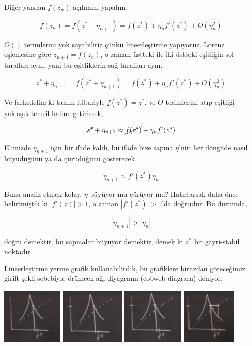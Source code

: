 \documentclass[12pt,fleqn]{article}\usepackage{../../common}
\begin{document}
Diğer yandan $f(z_n)$ açılımını yapalım,

$$ 
f(z_n) =  f(z^* + \eta_{n+1}) = f(z^*) + \eta_n f'(z^*) + O(\eta_n^2)
$$

$O()$ terimlerini yok sayabiliriz çünkü lineerleştirme yapıyoruz. Lorenz
eşlemesine göre $z_{n+1} = f(z_n)$, o zaman üstteki ile iki üstteki
eşitliğin sol tarafları aynı, yani bu eşitliklerin sağ tarafları aynı.

$$ 
z^* + \eta_{n+1} =  f(z^* + \eta_{n+1}) = f(z^*) + \eta_n f'(z^*) +
O(\eta_n^2)
$$

Ve farkedelim ki tanım itibariyle $f(z^*) = z^*$, ve $O$ terimlerini atıp
eşitliği yaklaşık temsil haline getirirsek,

$$ 
\cancel{z^*} + \eta_{n+1} \approx \cancel{f(z^*)} + \eta_n f'(z^*) 
$$

Elimizde $\eta_{n+1}$ için bir ifade kaldı, bu ifade bize sapma $\eta$'nin
her döngüde nasıl büyüdüğünü ya da çürüdüğünü gösterecek.

$$ \eta_{n+1} \approx f'(z^*) \eta_n $$

Bunu analiz etmek kolay, $\eta$ büyüyor mu çürüyor mu? Hatırlarsak daha
önce belirtmiştik ki $|f'(z)| > 1$, o zaman $|f'(z^*)| > 1$'da doğrudur. Bu
durumda,

$$ |\eta_{n+1}| > |\eta_n| $$

doğru demektir, bu sapmalar büyüyor demektir, demek ki $z^*$ bir
gayri-stabil noktadır.

Lineerleştirme yerine grafik kullanabilirdik, bu grafiklere birazdan
göreceğimiz girift şekli sebebiyle örümcek ağı diyagramı (cobweb diagram)
deniyor. 

\includegraphics[width=8em]{18_11.png}
\includegraphics[width=8.4em]{18_12.png}
\includegraphics[width=8.1em]{18_14.png}
\includegraphics[width=7.1em]{18_15.png}
\end{document}
